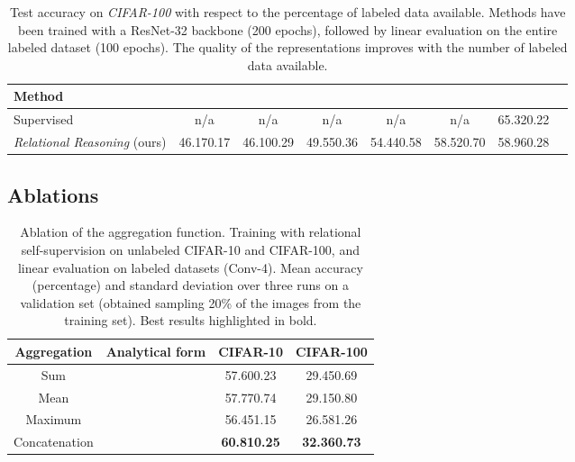 \documentclass{article}
\begin{document}
\begin{table}[H]
 \caption{Test accuracy on \emph{CIFAR-100} with respect to the percentage of labeled data available. Methods have been trained with a ResNet-32 backbone (200 epochs), followed by linear evaluation on the entire labeled dataset (100 epochs). The quality of the representations improves with the number of labeled data available.}
 \label{tab:semisupervised-cifar100}
 \begin{adjustbox}{width=1.0\columnwidth,center}
  \centering
  \begin{tabular}{lccccccc}
    \toprule
    \textbf{Method} &
     &  &  &  & & \\
    \midrule
    Supervised & 
    n/a & n/a & n/a & n/a & n/a & 65.32\small{0.22}\\
    \emph{Relational Reasoning} (ours) & 
    46.17\small{0.17} & 46.10\small{0.29} & 49.55\small{0.36} & 54.44\small{0.58} &
    58.52\small{0.70} & 58.96\small{0.28} \\
    \bottomrule
  \end{tabular}
 \end{adjustbox}
\end{table}


\subsection{Ablations} \label{appendix:additional_ablations}
\FloatBarrier

\begin{table}[H]
 \caption{Ablation of the aggregation function. Training with relational self-supervision on unlabeled CIFAR-10 and CIFAR-100, and linear evaluation on labeled datasets (Conv-4). Mean accuracy (percentage) and standard deviation over three runs on a validation set (obtained sampling 20\% of the images from the training set). Best results highlighted in bold.}
 \label{tab:aggregation_comparison}
 \begin{adjustbox}{width=0.65\columnwidth,center}
  \centering
  \begin{tabular}{cccc}
    \toprule
    \textbf{Aggregation} &\textbf{Analytical form} &
    \textbf{CIFAR-10} & \textbf{CIFAR-100} \\
    \midrule
    Sum &  & 
    57.60\small{0.23} & 29.45\small{0.69} \\
    Mean &  & 
    57.77\small{0.74} & 29.15\small{0.80} \\
    Maximum &  & 
    56.45\small{1.15} & 26.58\small{1.26} \\
    Concatenation &  
    & \textbf{60.81\small{0.25}} & \textbf{32.36\small{0.73}}\\
    \bottomrule
  \end{tabular}
 \end{adjustbox}
\end{table}
\end{document}
